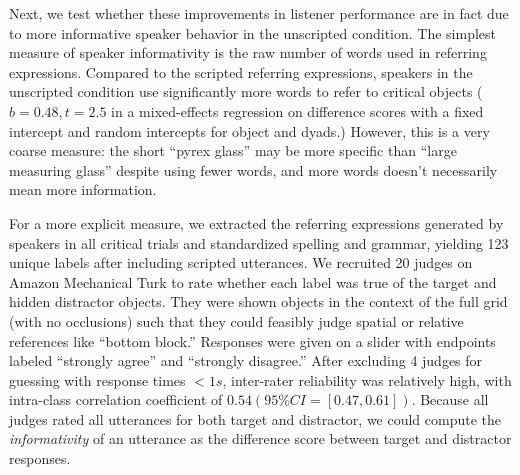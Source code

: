 \documentclass[manuscript]{stjour}
\begin{document}
Next, we test whether these improvements in listener performance are in fact due to more informative speaker behavior in the unscripted condition. %
The simplest measure of speaker informativity is the raw number of   words used in referring expressions. Compared to the scripted referring expressions, speakers in the unscripted condition use significantly more words to refer to critical objects ($b = 0.48, t = 2.5$ in a mixed-effects regression on difference scores with a fixed intercept and random intercepts for object and dyads.) However, this is a very coarse measure: the short ``pyrex glass'' may be more specific than ``large measuring glass'' despite using fewer words, and more words doesn't necessarily mean more information.

For a more explicit measure, we extracted the referring expressions generated by speakers in all critical trials and standardized spelling and grammar, yielding 123 unique labels after including scripted utterances. We recruited 20 judges on Amazon Mechanical Turk to rate whether each label was true of the target and hidden distractor objects. They were shown objects in the context of the full grid (with no occlusions) such that they could feasibly judge spatial or relative references like ``bottom block.'' Responses were given on a slider with endpoints labeled ``strongly agree'' and ``strongly disagree.''  After excluding 4 judges for guessing with response times $< 1s$, inter-rater reliability was relatively high, with intra-class correlation coefficient of $0.54 (95\% CI = [0.47, 0.61])$. Because all judges rated all utterances for both target and distractor, we could compute the \emph{informativity} of an utterance as the difference score between target and distractor responses.
\end{document}
